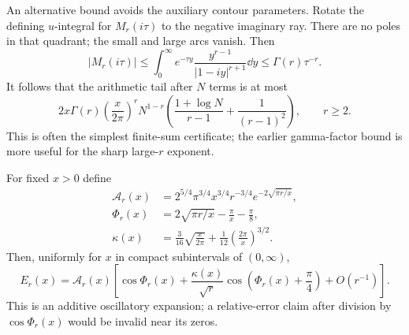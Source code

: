 An alternative bound avoids the auxiliary contour parameters.
Rotate the defining \(u\)-integral for \(M_r(i\tau)\) to the negative
imaginary ray. There are no poles in that quadrant; the small and
large arcs vanish. Then
\[
 |M_r(i\tau)|
 \leq\int_0^\infty e^{-\tau y}
       \frac{y^{r-1}}{|1-iy|^{r+1}}\dd y
 \leq\Gamma(r)\tau^{-r}.
\]
It follows that the arithmetic tail after \(N\) terms is at most
\begin{equation}\label{eq:herglotz-simple-tail}
 2x\Gamma(r)\left(\frac{x}{2\pi}\right)^r N^{1-r}
 \left(\frac{1+\log N}{r-1}+\frac1{(r-1)^2}\right),
 \qquad r\geq2.
\end{equation}
This is often the simplest finite-sum certificate; the earlier
gamma-factor bound is more useful for the sharp large-\(r\) exponent.

\begin{theorem}\label{thm:herglotz-oscillation}
For fixed $x>0$ define
\begin{align*}
 \mathcal A_r(x)&=
 2^{5/4}\pi^{3/4}x^{3/4}r^{-3/4}
       e^{-2\sqrt{\pi r/x}},\\
 \Phi_r(x)&=2\sqrt{\pi r/x}-\frac\pi x-\frac\pi8,\\
 \kappa(x)&=\frac3{16}\sqrt{\frac{x}{2\pi}}
             +\frac1{12}\left(\frac{2\pi}{x}\right)^{3/2}.
\end{align*}
Then, uniformly for $x$ in compact subintervals of $(0,\infty)$,
\[
 E_r(x)=\mathcal A_r(x)
 \left[\cos\Phi_r(x)+\frac{\kappa(x)}{\sqrt r}
          \cos\left(\Phi_r(x)+\frac\pi4\right)
          +O(r^{-1})\right].
\]
This is an additive oscillatory expansion; a relative-error claim after
division by $\cos\Phi_r(x)$ would be invalid near its zeros.
\end{theorem}

